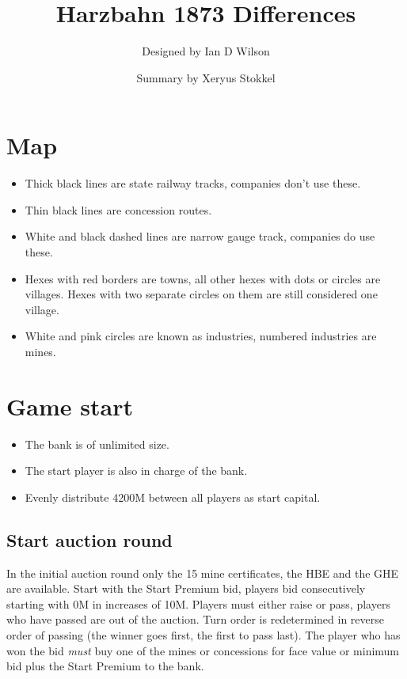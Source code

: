 \documentclass[a4paper,twocolumn]{article}
\title{Harzbahn 1873 Differences}
\author{Designed by Ian D Wilson}
\date{Summary by Xeryus Stokkel}
\begin{document}
\maketitle

\section{Map}
\begin{itemize}
	\setlength{\itemsep}{0em}
	\item Thick black lines are state railway tracks, companies don't use these.
	\item Thin black lines are concession routes.
	\item White and black dashed lines are narrow gauge track, companies do use
	these.
	\item Hexes with red borders are towns, all other hexes with dots or circles
	are villages. Hexes with two separate circles on them are still considered
	one village.
	\item White and pink circles are known as industries, numbered industries
	are mines.
\end{itemize}

\section{Game start}
\begin{itemize}
	\item The bank is of unlimited size.
	\item The start player is also in charge of the bank.
	\item Evenly distribute 4200M between all players as start capital.
\end{itemize}

\subsection{Start auction round}
In the initial auction round only the 15 mine certificates, the HBE and the GHE
are available. Start with the Start Premium bid, players bid consecutively
starting with 0M in increases of 10M. Players must either raise or pass, players
who have passed are out of the auction. Turn order is redetermined in reverse
order of passing (the winner goes first, the first to pass last). The player who
has won the bid \emph{must} buy one of the mines or concessions for face value
or minimum bid plus the Start Premium to the bank.
\end{document}
